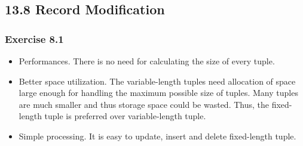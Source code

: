 \documentclass[../../main.tex]{subfiles}
\begin{document}
\subsection{13.8 Record Modification}

\subsubsection*{Exercise 8.1}

\begin{itemize}
  \item Performances. There is no need for calculating the size of every tuple.
  \item Better space utilization. The variable-length tuples need allocation of
        space large enough for handling the maximum possible size of tuples. Many
        tuples are much smaller and thus storage space could be wasted. Thus,
        the fixed-length tuple is preferred over variable-length tuple.
  \item Simple processing. It is easy to update, insert and delete fixed-length tuple.
\end{itemize}
\end{document}
